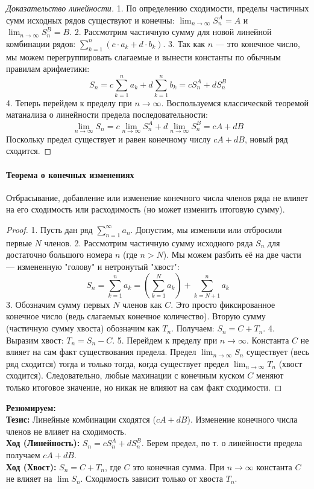 \begin{proof}[Доказательство линейности]
1. По определению сходимости, пределы частичных сумм исходных рядов существуют и конечны: $\lim_{n \to \infty} S_n^A = A$ и $\lim_{n \to \infty} S_n^B = B$.
2. Рассмотрим частичную сумму для новой линейной комбинации рядов: $\sum_{k=1}^n (c \cdot a_k + d \cdot b_k)$.
3. Так как $n$ — это конечное число, мы можем перегруппировать слагаемые и вынести константы по обычным правилам арифметики:
$$ S_n = c \sum_{k=1}^n a_k + d \sum_{k=1}^n b_k = c S_n^A + d S_n^B $$
4. Теперь перейдем к пределу при $n \to \infty$. Воспользуемся классической теоремой матанализа о линейности предела последовательности:
$$ \lim_{n \to \infty} S_n = c \lim_{n \to \infty} S_n^A + d \lim_{n \to \infty} S_n^B = cA + dB $$
Поскольку предел существует и равен конечному числу $cA + dB$, новый ряд сходится.
\end{proof}

\paragraph{Теорема о конечных изменениях}
Отбрасывание, добавление или изменение конечного числа членов ряда не влияет на его сходимость или расходимость (но может изменить итоговую сумму).

\begin{proof}
1. Пусть дан ряд $\sum_{n=1}^\infty a_n$. Допустим, мы изменили или отбросили первые $N$ членов.
2. Рассмотрим частичную сумму исходного ряда $S_n$ для достаточно большого номера $n$ (где $n > N$). Мы можем разбить её на две части — измененную "голову" и нетронутый "хвост":
$$ S_n = \sum_{k=1}^n a_k = \left( \sum_{k=1}^N a_k \right) + \sum_{k=N+1}^n a_k $$
3. Обозначим сумму первых $N$ членов как $C$. Это просто фиксированное конечное число (ведь слагаемых конечное количество). Вторую сумму (частичную сумму хвоста) обозначим как $T_n$. 
Получаем: $S_n = C + T_n$.
4. Выразим хвост: $T_n = S_n - C$.
5. Перейдем к пределу при $n \to \infty$. Константа $C$ не влияет на сам факт существования предела. Предел $\lim_{n \to \infty} S_n$ существует (весь ряд сходится) тогда и только тогда, когда существует предел $\lim_{n \to \infty} T_n$ (хвост сходится).
Следовательно, любые махинации с конечным куском $C$ меняют только итоговое значение, но никак не влияют на сам факт сходимости.
\end{proof}


\begin{tcolorbox}[colback=gray!5, colframe=black, boxrule=0.5pt, arc=0pt]
\textbf{Резюмируем:} \\
\textbf{Тезис:} Линейные комбинации сходятся ($cA+dB$). Изменение конечного числа членов не влияет на сходимость. \\
\textbf{Ход (Линейность):} $S_n = c S_n^A + d S_n^B$. Берем предел, по т. о линейности предела получаем $cA+dB$. \\
\textbf{Ход (Хвост):} $S_n = C + T_n$, где $C$ это конечная сумма. При $n \to \infty$ константа $C$ не влияет на $\lim S_n$. Сходимость зависит только от хвоста $T_n$.
\end{tcolorbox}




